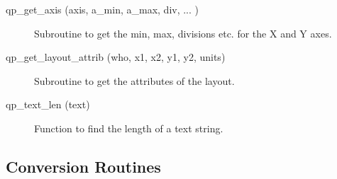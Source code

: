 \begin{description}

\item[qp\_get\_axis (axis, a\_min, a\_max, div, ... ) ] \Newline
     Subroutine to get the min, max, divisions etc. for the X and Y axes.

\item[qp\_get\_layout\_attrib (who, x1, x2, y1, y2, units)] \Newline 
     Subroutine to get the attributes of the layout.

\item[qp\_text\_len (text)] \Newline 
     Function to find the length of a text string.

\end{description}

\subsection{Conversion Routines}

